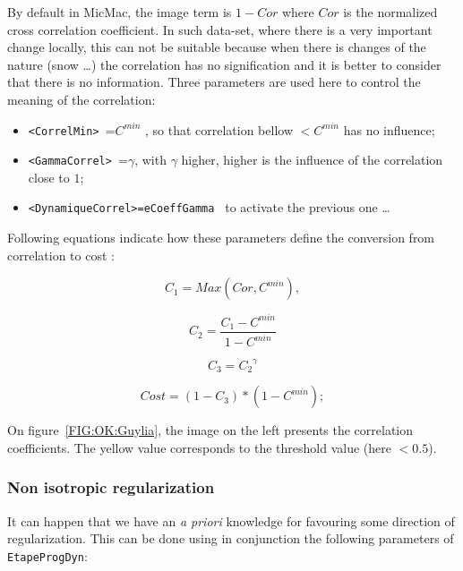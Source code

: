 By default in MicMac, the image term is $1-Cor$ where $Cor$ is the normalized cross correlation
coefficient. In such data-set, where there is a very important change locally, this can not be
suitable because when there is changes of the nature (snow \dots)  the correlation has no
signification and it is better to consider that there is no information. %
Three parameters are used here to control the meaning of the correlation:


\begin{itemize}
   \item {\tt  <CorrelMin> }=$C^{min}$ ,
         so  that correlation bellow $<C^{min}$ has no influence;
   \item {\tt  <GammaCorrel> }=$\gamma$, with $\gamma$ higher, higher is the influence of the correlation
         close to $1$;
   \item {\tt  <DynamiqueCorrel>=eCoeffGamma } to activate the previous one \dots
\end{itemize}

Following equations indicate how these parameters define the conversion from correlation to cost :

\begin{equation}
    C_1=Max(Cor,C^{min}) ,
\end{equation}

\begin{equation}
   C_2 = \frac{C_1 -C^{min}}{1-C^{min}}
\end{equation}

\begin{equation}
   C_3 = {C_2} ^\gamma
\end{equation}

\begin{equation}
   Cost  = (1-C_3) * (1-C^{min});
\end{equation}

On figure~\ref{FIG:OK:Guylia}, the image on the left presents the correlation coefficients. The yellow value corresponds to the threshold value (here $<0.5$).


\subsubsection{Non isotropic regularization}

It can happen that we have an \emph{a priori} knowledge for favouring some direction of regularization.
This can be done using in conjunction the following parameters of {\tt EtapeProgDyn}:

